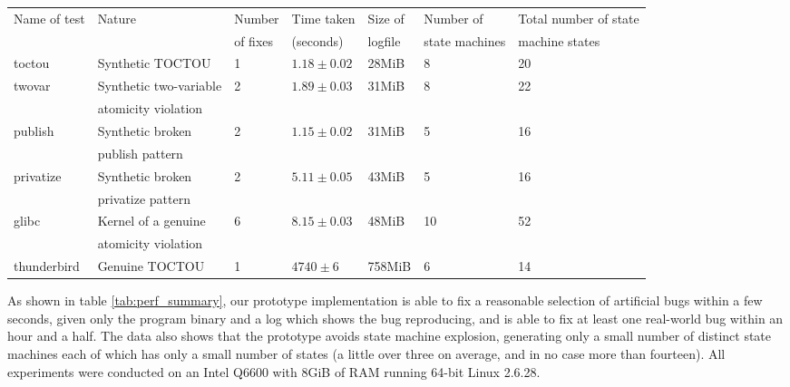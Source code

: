 \documentclass[10pt,twocolumn,preprint,natbib,authoryear]{sigplanconf}
\begin{document}
\begin{table*}
\begin{tabular}{lllllll}
Name of test & Nature & Number & Time taken & Size of & Number of & Total number of state\\
 & & of fixes & (seconds) & logfile & state machines & machine states\\
\hline
toctou & Synthetic TOCTOU & 1 & $1.18 \pm 0.02$ & 28MiB & 8 & 20\\
twovar & Synthetic two-variable & 2 & $1.89 \pm 0.03$ & 31MiB & 8 & 22\\
       & atomicity violation &&&\\
publish & Synthetic broken & 2 & $1.15 \pm 0.02$ & 31MiB & 5 & 16 \\
        & publish pattern & & & \\
privatize & Synthetic broken & 2 & $5.11 \pm 0.05$ & 43MiB & 5 & 16 \\
          & privatize pattern & & & \\
\hline
glibc & Kernel of a genuine & 6 & $8.15 \pm 0.03$ & 48MiB & 10 & 52\\
      & atomicity violation & & & \\
\hline
thunderbird & Genuine TOCTOU & 1 & $4740 \pm 6$ & 758MiB & 6 & 14
\end{tabular}
\caption{Summary of results obtained from running the fix generating
  tool on a single log file collected from each bug.  The ``Time taken''
  column gives the mean and standard deviation from five runs.}
\label{tab:perf_summary}
\end{table*}

As shown in table \ref{tab:perf_summary}, our prototype implementation
is able to fix a reasonable selection of artificial bugs within a few
seconds, given only the program binary and a log which shows the bug
reproducing, and is able to fix at least one real-world bug within an
hour and a half.  The data also shows that the prototype avoids state
machine explosion, generating only a small number of distinct state
machines each of which has only a small number of states (a little
over three on average, and in no case more than fourteen).  All
experiments were conducted on an Intel Q6600 with 8GiB of RAM running
64-bit Linux 2.6.28.

\begin{figure*}
\hspace{10mm} 
\caption{Breakdown of time spent in various phases of the analysis
  process.  Results presented are mean and standard deviation of five
  runs of the fix-generating program applied to a single log file for
  each bug.}
\end{figure*}
\end{document}
